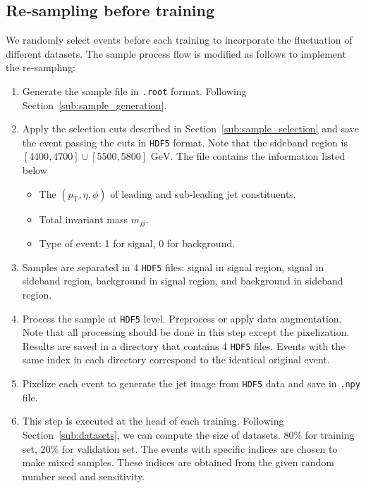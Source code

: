 \documentclass[12pt]{article}
\begin{document}
    \subsection{Re-sampling before training}%
    \label{sub:re_sampling_before_training}
        We randomly select events before each training to incorporate the fluctuation of different datasets. The sample process flow is modified as follows to implement the re-sampling:
        \begin{enumerate}
            \item Generate the sample file in \verb|.root| format. Following Section~\ref{sub:sample_generation}.
            \item Apply the selection cuts described in Section~\ref{sub:sample_selection} and save the event passing the cuts in \verb|HDF5| format. Note that the sideband region is $[4400,4700] \cup [5500,5800] \text{ GeV}$. The file contains the information listed below
                \begin{itemize}
                    \item The $\left( p_{\text{T}}, \eta, \phi \right) $ of leading and sub-leading jet constituents.
                    \item Total invariant mass $m_{jj}$.
                    \item Type of event: 1 for signal, 0 for background.
                \end{itemize}
            \item Samples are separated in 4 \verb|HDF5| files: signal in signal region, signal in sideband region, background in signal region, and background in sideband region.
            \item Process the sample at \verb|HDF5| level. Preprocess or apply data augmentation. Note that all processing should be done in this step except the pixelization. Results are saved in a directory that contains 4 \verb|HDF5| files. Events with the same index in each directory correspond to the identical original event.
            \item Pixelize each event to generate the jet image from \verb|HDF5| data and save in \verb|.npy| file.
            \item This step is executed at the head of each training. Following Section~\ref{sub:datasets}, we can compute the size of datasets. 80\% for training set, 20\% for validation set. The events with specific indices are chosen to make mixed samples. These indices are obtained from the given random number seed and sensitivity.


\end{enumerate}
\end{document}
